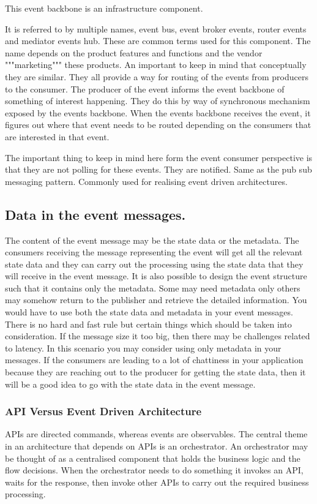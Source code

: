 \begin{note}
    This event backbone is an infrastructure component.
\end{note}

It is referred to by multiple names, event bus, event broker events, router events and mediator events hub.
These are common terms used for this component.
The name depends on the product features and functions and the vendor """marketing""" these products.
An important to keep in mind that conceptually they are similar.
They all provide a way for routing of the events from producers to the consumer.
The producer of the event informs the event backbone of something of interest happening.
They do this by way of synchronous mechanism exposed by the events backbone.
When the events backbone receives the event, it figures out where that event needs to be routed depending on the consumers that are interested in that event.

The important thing to keep in mind here form the event consumer perspective is that they are not polling for these events.
They are notified.
Same as the pub sub messaging pattern.
Commonly used for realising event driven architectures.

\subsection{Data in the event messages.}
The content of the event message may be the state data or the metadata.
The consumers receiving the message representing the event will get all the relevant state data and they can carry out the processing using the state data that they will receive in the event message.
It is also possible to design the event structure such that it contains only the metadata.
Some may need metadata only others may somehow return to the publisher and retrieve the detailed information.
You would have to use both the state data and metadata in your event messages.
There is no hard and fast rule but certain things which should be taken into consideration.
If the message size it too big, then there may be challenges related to latency.
In this scenario you may consider using only metadata in your messages.
If the consumers are leading to a lot of chattiness in your application because they are reaching out to the producer for getting the state data, then it will be a good idea to go with the state data in the event message.

\subsubsection{API Versus Event Driven Architecture}
APIs are directed commands, whereas events are observables.
The central theme in an architecture that depends on APIs is an orchestrator.
An orchestrator may be thought of as a centralised component that holds the business logic and the flow decisions.
When the orchestrator needs to do something it invokes an API, waits for the response, then invoke other APIs to carry out the required business processing.

